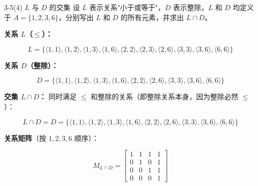 \documentclass[11pt]{article}
\begin{document}
\begin{question}{3-5(4) $L$ 与 $D$ 的交集}
  设 $L$ 表示关系"小于或等于"，$D$ 表示整除，$L$ 和 $D$ 均定义于 $A = \{1, 2, 3, 6\}$，分别写出 $L$ 和 $D$ 的所有元素，并求出 $L \cap D$。

  \begin{answer}
    \textbf{关系 $L$（$\leqslant$）：}

    $$L = \{\langle 1,1\rangle, \langle 1,2\rangle, \langle 1,3\rangle, \langle 1,6\rangle, \langle 2,2\rangle, \langle 2,3\rangle, \langle 2,6\rangle, \langle 3,3\rangle, \langle 3,6\rangle, \langle 6,6\rangle\}$$

    \vspace{0.3em}
    \textbf{关系 $D$（整除）：}

    $$D = \{\langle 1,1\rangle, \langle 1,2\rangle, \langle 1,3\rangle, \langle 1,6\rangle, \langle 2,2\rangle, \langle 2,6\rangle, \langle 3,3\rangle, \langle 3,6\rangle, \langle 6,6\rangle\}$$

    \vspace{0.3em}
    \textbf{交集 $L \cap D$：} 同时满足 $\leqslant$ 和整除的关系（即整除关系本身，因为整除必然 $\leqslant$）：

    $$L \cap D = D = \{\langle 1,1\rangle, \langle 1,2\rangle, \langle 1,3\rangle, \langle 1,6\rangle, \langle 2,2\rangle, \langle 2,6\rangle, \langle 3,3\rangle, \langle 3,6\rangle, \langle 6,6\rangle\}$$

    \vspace{0.3em}
    \textbf{关系矩阵}（按 $1, 2, 3, 6$ 顺序）：

    $$
    M_{L \cap D} = \begin{bmatrix}
      1 & 1 & 1 & 1 \\
      0 & 1 & 0 & 1 \\
      0 & 0 & 1 & 1 \\
      0 & 0 & 0 & 1
    \end{bmatrix}
    $$
  \end{answer}
\end{question}

\end{document}
